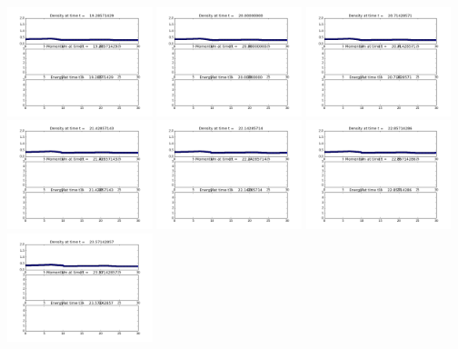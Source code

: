 \documentclass[11pt]{article}
\begin{document}
\vskip 10pt 
\includegraphics[width=0.316666666667\textwidth]{frame0027fig1.png}
\vskip 10pt 
\includegraphics[width=0.316666666667\textwidth]{frame0028fig1.png}
\vskip 10pt 
\includegraphics[width=0.316666666667\textwidth]{frame0029fig1.png}
\vskip 10pt 
\includegraphics[width=0.316666666667\textwidth]{frame0030fig1.png}
\vskip 10pt 
\includegraphics[width=0.316666666667\textwidth]{frame0031fig1.png}
\vskip 10pt 
\includegraphics[width=0.316666666667\textwidth]{frame0032fig1.png}
\vskip 10pt 
\includegraphics[width=0.316666666667\textwidth]{frame0033fig1.png}
\end{document}
